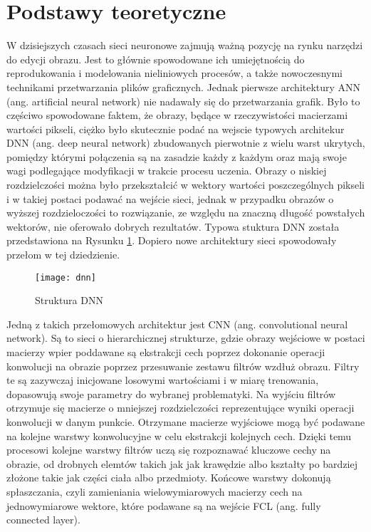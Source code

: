 \section{Podstawy teoretyczne}

  W dzisiejszych czasach sieci neuronowe zajmują ważną pozycję na rynku narzędzi
  do edycji obrazu. Jest to głównie spowodowane ich umiejętnością do
  reprodukowania i modelowania nieliniowych procesów, a także nowoczesnymi
  technikami przetwarzania plików graficznych.
  Jednak pierwsze architektury ANN (ang. artificial neural network) nie nadawały
  się do przetwarzania grafik.
  Było to częściwo spowodowane faktem, że obrazy, będące w rzeczywistości macierzami
  wartości pikseli,
  ciężko było skutecznie podać
  na wejscie typowych architekur DNN (ang. deep neural network) zbudowanych
  pierwotnie z wielu warst ukrytych, pomiędzy którymi połączenia są na zasadzie
  każdy z każdym oraz mają swoje wagi podlegające modyfikacji w trakcie procesu
  uczenia.
  Obrazy o niskiej rozdzielczości można było przekształcić w wektory
  wartości poszczególnych pikseli i w takiej postaci podawać na wejście sieci,
  jednak w przypadku obrazów o wyższej rozdzieloczości to rozwiązanie, ze
  względu na znaczną długość powstałych wektorów, nie oferowało dobrych
  rezultatów.
  Typowa stuktura DNN została przedstawiona na Rysunku \ref{fig:dnn}.
  Dopiero nowe architektury sieci spowodowały przełom w tej dziedzienie.

  \begin{figure}[h]
    \centering
    \texttt{[image: dnn]}
    \caption{Struktura DNN}
    \label{fig:dnn}
  \end{figure}

  Jedną z takich przełomowych architektur jest CNN (ang. convolutional neural
  network). Są to sieci o hierarchicznej strukturze, gdzie obrazy wejściowe w
  postaci macierzy wpier poddawane są ekstrakcji cech poprzez dokonanie operacji
  konwolucji na obrazie poprzez przesuwanie zestawu filtrów wzdłuż obrazu.
  Filtry te są zazywczaj inicjowane losowymi wartościami i w miarę trenowania,
  dopasowują swoje parametry do wybranej problematyki.
  Na wyjściu filtrów otrzymuje się macierze o mniejszej rozdzielczości
  reprezentujące wyniki operacji konwolucji w danym punkcie. Otrzymane macierze
  wyjściowe mogą być podawane na kolejne warstwy konwolucyjne w celu ekstrakcji
  kolejnych cech. Dzięki temu procesowi kolejne warstwy filtrów uczą się
  rozpoznawać kluczowe cechy na obrazie, od drobnych elemtów takich jak jak
  krawędzie albo kształty po bardziej złożone takie jak części ciała albo
  przedmioty.
  Końcowe warstwy dokonują spłaszczania, czyli zamieniania wielowymiarowych
  macierzy cech na jednowymiarowe wektore, które podawane są na wejście
  FCL (ang. fully connected layer).



